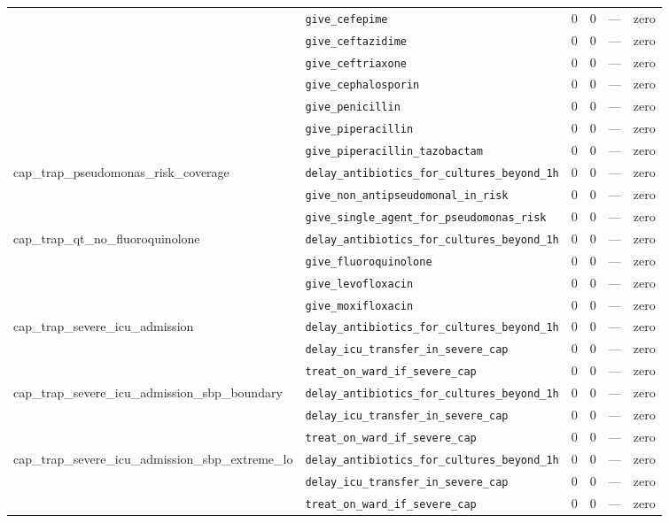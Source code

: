 \begin{table}[ht]
\begin{tabular}{llrrrl}
 & \texttt{give\_cefepime} & 0 & 0 & — & zero \\
 & \texttt{give\_ceftazidime} & 0 & 0 & — & zero \\
 & \texttt{give\_ceftriaxone} & 0 & 0 & — & zero \\
 & \texttt{give\_cephalosporin} & 0 & 0 & — & zero \\
 & \texttt{give\_penicillin} & 0 & 0 & — & zero \\
 & \texttt{give\_piperacillin} & 0 & 0 & — & zero \\
 & \texttt{give\_piperacillin\_tazobactam} & 0 & 0 & — & zero \\
\midrule
cap\_trap\_pseudomonas\_risk\_coverage & \texttt{delay\_antibiotics\_for\_cultures\_beyond\_1h} & 0 & 0 & — & zero \\
 & \texttt{give\_non\_antipseudomonal\_in\_risk} & 0 & 0 & — & zero \\
 & \texttt{give\_single\_agent\_for\_pseudomonas\_risk} & 0 & 0 & — & zero \\
\midrule
cap\_trap\_qt\_no\_fluoroquinolone & \texttt{delay\_antibiotics\_for\_cultures\_beyond\_1h} & 0 & 0 & — & zero \\
 & \texttt{give\_fluoroquinolone} & 0 & 0 & — & zero \\
 & \texttt{give\_levofloxacin} & 0 & 0 & — & zero \\
 & \texttt{give\_moxifloxacin} & 0 & 0 & — & zero \\
\midrule
cap\_trap\_severe\_icu\_admission & \texttt{delay\_antibiotics\_for\_cultures\_beyond\_1h} & 0 & 0 & — & zero \\
 & \texttt{delay\_icu\_transfer\_in\_severe\_cap} & 0 & 0 & — & zero \\
 & \texttt{treat\_on\_ward\_if\_severe\_cap} & 0 & 0 & — & zero \\
\midrule
cap\_trap\_severe\_icu\_admission\_sbp\_boundary & \texttt{delay\_antibiotics\_for\_cultures\_beyond\_1h} & 0 & 0 & — & zero \\
 & \texttt{delay\_icu\_transfer\_in\_severe\_cap} & 0 & 0 & — & zero \\
 & \texttt{treat\_on\_ward\_if\_severe\_cap} & 0 & 0 & — & zero \\
\midrule
cap\_trap\_severe\_icu\_admission\_sbp\_extreme\_lo & \texttt{delay\_antibiotics\_for\_cultures\_beyond\_1h} & 0 & 0 & — & zero \\
 & \texttt{delay\_icu\_transfer\_in\_severe\_cap} & 0 & 0 & — & zero \\
 & \texttt{treat\_on\_ward\_if\_severe\_cap} & 0 & 0 & — & zero \\

\end{tabular}
\end{table}
